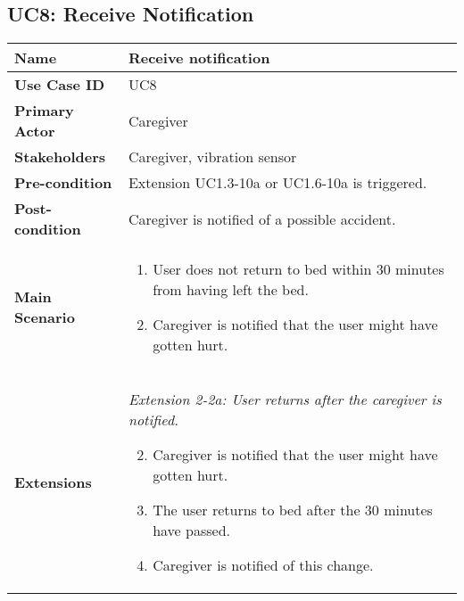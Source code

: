     \subsection{UC8: Receive Notification}
    \begin{tabular}{|p{}||p{}|}
        \hline
        \textbf{Name} & Receive notification\\
        \hline
        \textbf{Use Case ID} & UC8\\
        \hline
        \textbf{Primary Actor} & Caregiver\\
        \hline
        \textbf{Stakeholders} & Caregiver, vibration sensor\\
        \hline
        \textbf{Pre-condition} & Extension UC1.3-10a or UC1.6-10a is triggered.\\
        \hline
        \textbf{Post-condition} & Caregiver is notified of a possible accident. \\
        \hline
        \textbf{Main Scenario} &
            \begin{enumerate}
                \item User does not return to bed within 30 minutes from having left the bed.
                \item Caregiver is notified that the user might have gotten hurt.
            \end{enumerate}
        \\
        \hline
        \textbf{Extensions} &
        \textit{Extension 2-2a: User returns after the caregiver is notified.}
        
        \begin{enumerate}
            \setcounter{enumi}{1}
            \item Caregiver is notified that the user might have gotten hurt.
            \item The user returns to bed after the 30 minutes have passed.
            \item Caregiver is notified of this change.
        \end{enumerate}\\
        \hline
    \end{tabular}
    

